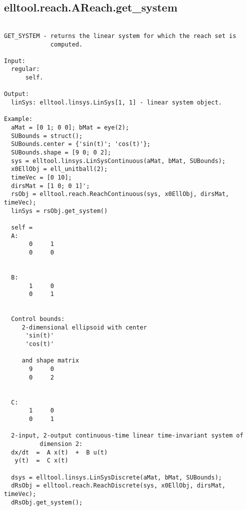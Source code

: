 \subsection{\texorpdfstring{elltool.reach.AReach.get\_system}{get\_system}}\label{method:elltool.reach.AReach.getsystem}
\begin{verbatim}

GET_SYSTEM - returns the linear system for which the reach set is
             computed.

Input:
  regular:
      self.

Output:
  linSys: elltool.linsys.LinSys[1, 1] - linear system object.

Example:
  aMat = [0 1; 0 0]; bMat = eye(2);
  SUBounds = struct();
  SUBounds.center = {'sin(t)'; 'cos(t)'};
  SUBounds.shape = [9 0; 0 2];
  sys = elltool.linsys.LinSysContinuous(aMat, bMat, SUBounds);
  x0EllObj = ell_unitball(2);
  timeVec = [0 10];
  dirsMat = [1 0; 0 1]';
  rsObj = elltool.reach.ReachContinuous(sys, x0EllObj, dirsMat, timeVec);
  linSys = rsObj.get_system()

  self =
  A:
       0     1
       0     0


  B:
       1     0
       0     1


  Control bounds:
     2-dimensional ellipsoid with center
      'sin(t)'
      'cos(t)'

     and shape matrix
       9     0
       0     2


  C:
       1     0
       0     1

  2-input, 2-output continuous-time linear time-invariant system of
          dimension 2:
  dx/dt  =  A x(t)  +  B u(t)
   y(t)  =  C x(t)

  dsys = elltool.linsys.LinSysDiscrete(aMat, bMat, SUBounds);
  dRsObj = elltool.reach.ReachDiscrete(sys, x0EllObj, dirsMat, timeVec);
  dRsObj.get_system();
\end{verbatim}
